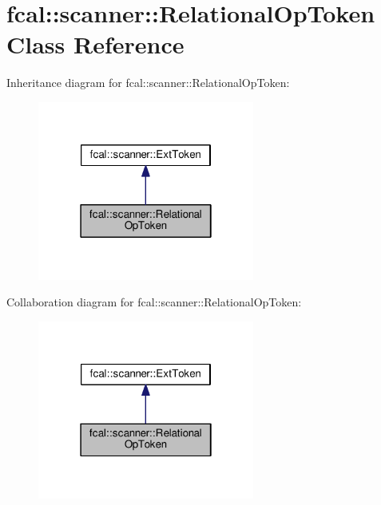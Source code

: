 \hypertarget{classfcal_1_1scanner_1_1RelationalOpToken}{}\section{fcal\+:\+:scanner\+:\+:Relational\+Op\+Token Class Reference}
\label{classfcal_1_1scanner_1_1RelationalOpToken}


Inheritance diagram for fcal\+:\+:scanner\+:\+:Relational\+Op\+Token\+:\nopagebreak
\begin{figure}[H]
\begin{center}
\leavevmode
\includegraphics[width=202pt]{classfcal_1_1scanner_1_1RelationalOpToken__inherit__graph}
\end{center}
\end{figure}


Collaboration diagram for fcal\+:\+:scanner\+:\+:Relational\+Op\+Token\+:\nopagebreak
\begin{figure}[H]
\begin{center}
\leavevmode
\includegraphics[width=202pt]{classfcal_1_1scanner_1_1RelationalOpToken__coll__graph}
\end{center}
\end{figure}

